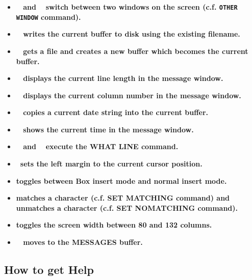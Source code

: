 \begin{itemize}
\item {\bf \gold\ \keyname{$\bigtriangleup$} and \gold\
       \keyname{$\bigtriangledown$} switch
       between two windows on the screen (c.f. {\tt OTHER WINDOW} command).}

\item {\bf \gold\  writes the current buffer to disk using the
       existing filename.}

\item {\bf \gold\  gets a file and creates a new buffer which
       becomes the current buffer.}

\item {\bf \gold\  displays the current line length in the message
       window.}

\item {\bf \gold\  displays the current column number in the
       message window.}

\item {\bf \gold\  copies a current date string into the current
       buffer.}

\item {\bf \gold\  shows the current time in the message window.}

\item {\bf \gold\ \keyname{/} and \gold\  execute the WHAT LINE
      command.}

\item {\bf {}  \ sets the left margin to the current
      cursor position.}

\item {\bf {} toggles between Box insert mode and normal insert
       mode.}

\item {\bf {} matches a character (c.f. SET MATCHING command) and
       \gold\ \keyname{F18} unmatches a character (c.f. SET NOMATCHING
       command).}

\item {\bf {} toggles the screen width between 80 and 132 columns.}

\item {\bf \gold\  moves to the MESSAGES buffer.}

\end{itemize}

\subsection{How to get Help}
\label{getting_help}

